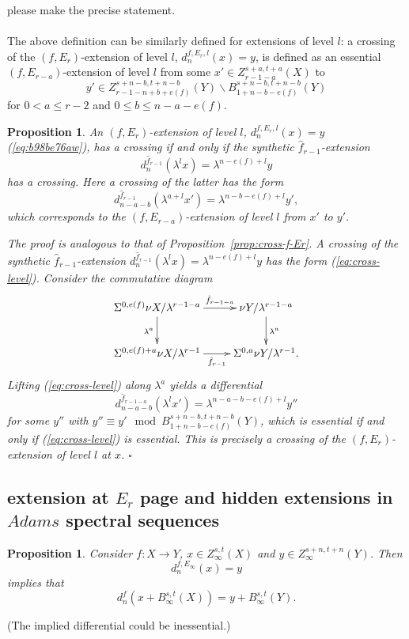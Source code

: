 \documentclass[12pt,a4paper]{article}
\renewenvironment{proof}{{\noindent\it\textbf{Proof}}\quad\it}{\hfill$\square$}
\newtheorem{proposition}[equation]{Proposition}
\newcommand{\Sus}{\Sigma}
\begin{document}
\begin{sloppy}
please make the precise statement.

\paragraph{}
The above definition can be similarly defined for extensions of level $l$: a crossing of the $(f,E_r)$-extension of level $l$, $d_{n}^{f,E_r,l}(x)=y$, is defined as an essential $(f, E_{r-a})$-extension of level $l$ from some $x'\in Z_{r-1-a}^{s+a,t+a}(X)$ to
$$y'\in Z_{r-1-n+b+e(f)}^{s+n-b,t+n-b}(Y)\backslash B_{1+n-b-e(f)}^{s+n-b,t+n-b}(Y)$$
for $0<a \le r-2$ and $0\le b\le n-a-e(f)$.

\begin{proposition}\label{prop:cross-f-Er-level}
    An $(f,E_r)$-extension of level $l$, $d_{n}^{f,E_r,l}(x)=y$ (\ref{eq:b98be76aw}), has a crossing if and only if the synthetic $\hat f_{r-1}$-extension
    $$d_{n}^{\hat f_{r-1}}(\lambda^l x)=\lambda^{n-e(f)+l} y$$
    has a crossing. Here a crossing of the latter has the form
    \begin{equation}\label{eq:cross-level}
        d_{n-a-b}^{\hat f_{r-1}}(\lambda^{a+l} x')=\lambda^{n-b-e(f)+l} y',
    \end{equation}
    which corresponds to the $(f,E_{r-a})$-extension of level $l$ from $x'$ to $y'$.
\end{proposition}

\begin{proof}
    The proof is analogous to that of Proposition~\ref{prop:cross-f-Er}. A crossing of the synthetic $\hat f_{r-1}$-extension $d_n^{\hat f_{r-1}}(\lambda^l x)=\lambda^{n-e(f)+l}y$ has the form (\ref{eq:cross-level}). Consider the commutative diagram
    $$\xymatrix{
        \Sus^{0,e(f)}\nu X/\lambda^{r-1-a} \ar[r]^-{\hat f_{r-1-a}} \ar[d]_{\lambda^a} & \nu Y/\lambda^{r-1-a} \ar[d]^{\lambda^a}\\
        \Sus^{0,e(f)+a}\nu X/\lambda^{r-1}\ar[r]_-{\hat f_{r-1}} & \Sus^{0,a}\nu Y/\lambda^{r-1}.\\
    }$$
    Lifting (\ref{eq:cross-level}) along $\lambda^a$ yields a differential
    $$d_{n-a-b}^{\hat f_{r-1-a}}(\lambda^l x')=\lambda^{n-a-b-e(f)+l}y''$$
    for some $y''$ with $y''\equiv y'\mod B_{1+n-b-e(f)}^{s+n-b,t+n-b}(Y)$, which is essential if and only if (\ref{eq:cross-level}) is essential. This is precisely a crossing of the $(f,E_r)$-extension of level $l$ at $x$.
\end{proof}

\subsection{extension at $E_r$ page and hidden extensions in $Adams$ spectral sequences}
\begin{proposition}
    Consider $f: X\to Y$, $x\in Z_\infty^{s,t}(X)$ and $y\in Z_\infty^{s+n,t+n}(Y)$.
    Then
    $$d^{f,E_\infty}_n(x)=y$$
    implies that
    $$d^{f}_n(x+B_\infty^{s,t}(X))=y+B_\infty^{s,t}(Y).$$
\end{proposition}
(The implied differential could be inessential.)


\end{sloppy}
\end{document}
